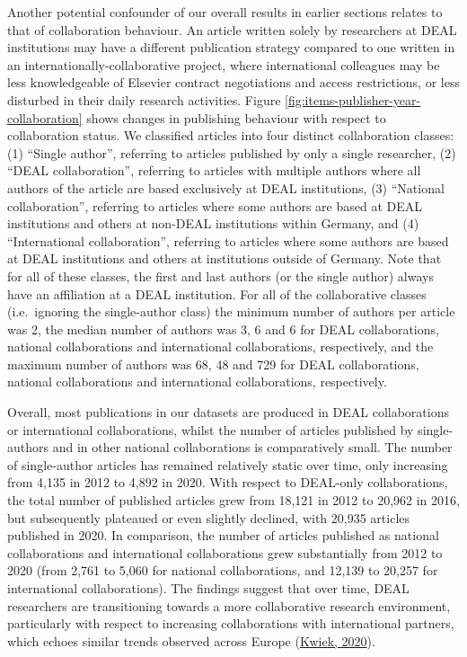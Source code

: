 \documentclass[
]{article}
\begin{document}
Another potential confounder of our overall results in earlier sections relates to that of collaboration behaviour. An article written solely by researchers at DEAL institutions may have a different publication strategy compared to one written in an internationally-collaborative project, where international colleagues may be less knowledgeable of Elsevier contract negotiations and access restrictions, or less disturbed in their daily research activities. Figure \ref{fig:items-publisher-year-collaboration} shows changes in publishing behaviour with respect to collaboration status. We classified articles into four distinct collaboration classes: (1) ``Single author'', referring to articles published by only a single researcher, (2) ``DEAL collaboration'', referring to articles with multiple authors where all authors of the article are based exclusively at DEAL institutions, (3) ``National collaboration'', referring to articles where some authors are based at DEAL institutions and others at non-DEAL institutions within Germany, and (4) ``International collaboration'', referring to articles where some authors are based at DEAL institutions and others at institutions outside of Germany. Note that for all of these classes, the first and last authors (or the single author) always have an affiliation at a DEAL institution. For all of the collaborative classes (i.e.~ignoring the single-author class) the minimum number of authors per article was 2, the median number of authors was 3, 6 and 6 for DEAL collaborations, national collaborations and international collaborations, respectively, and the maximum number of authors was 68, 48 and 729 for DEAL collaborations, national collaborations and international collaborations, respectively.

Overall, most publications in our datasets are produced in DEAL collaborations or international collaborations, whilst the number of articles published by single-authors and in other national collaborations is comparatively small. The number of single-author articles has remained relatively static over time, only increasing from 4,135 in 2012 to 4,892 in 2020. With respect to DEAL-only collaborations, the total number of published articles grew from 18,121 in 2012 to 20,962 in 2016, but subsequently plateaued or even slightly declined, with 20,935 articles published in 2020. In comparison, the number of articles published as national collaborations and international collaborations grew substantially from 2012 to 2020 (from 2,761 to 5,060 for national collaborations, and 12,139 to 20,257 for international collaborations). The findings suggest that over time, DEAL researchers are transitioning towards a more collaborative research environment, particularly with respect to increasing collaborations with international partners, which echoes similar trends observed across Europe (\href{https://doi.org/10.1080/03075079.2020.1749254}{Kwiek, 2020}).
\end{document}

